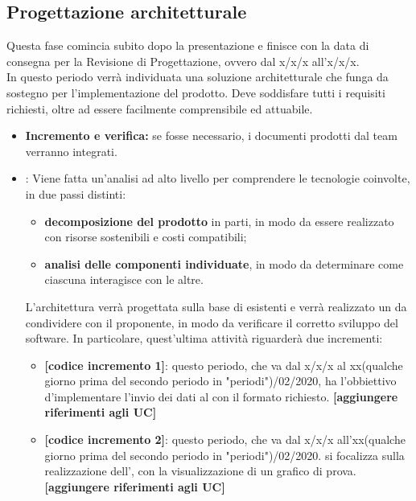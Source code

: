 \subsection{Progettazione architetturale}
Questa fase comincia subito dopo la presentazione e finisce con la data di consegna per la Revisione di Progettazione, ovvero dal x/x/x all'x/x/x.\\
In questo periodo verrà individuata una soluzione architetturale che funga da sostegno per l'implementazione del prodotto. Deve soddisfare tutti i requisiti richiesti, oltre ad essere facilmente comprensibile ed attuabile. 
\begin{itemize}
\item \textbf{Incremento e verifica:} se fosse necessario, i documenti prodotti dal team verranno integrati.

 \item {}: Viene fatta un'analisi ad alto livello per comprendere le tecnologie coinvolte, in due passi distinti:
\begin{itemize}
 \item \textbf{decomposizione del prodotto} in parti, in modo da essere realizzato con risorse sostenibili e costi compatibili;
 \item \textbf{analisi delle componenti individuate}, in modo da determinare come ciascuna interagisce con le altre.  
\end{itemize}
L'architettura verrà progettata sulla base di  esistenti e verrà realizzato un  da condividere con il proponente, in modo da verificare il corretto sviluppo del software. In particolare, quest'ultima attività riguarderà due incrementi:
\begin{itemize}
	\item \textbf{[codice incremento 1]}: questo periodo, che va dal x/x/x al xx(qualche giorno prima del secondo periodo in "periodi")/02/2020, ha l'obbiettivo d'implementare l'invio dei dati al  con il formato richiesto. \textbf{[aggiungere riferimenti agli UC]}
	\item \textbf{[codice incremento 2]}: questo periodo, che va dal x/x/x all'xx(qualche giorno prima del secondo periodo in "periodi")/02/2020. si focalizza   sulla realizzazione dell', con la visualizzazione di un grafico di prova. \textbf{[aggiungere riferimenti agli UC]}
\end{itemize} 

\end{itemize}

